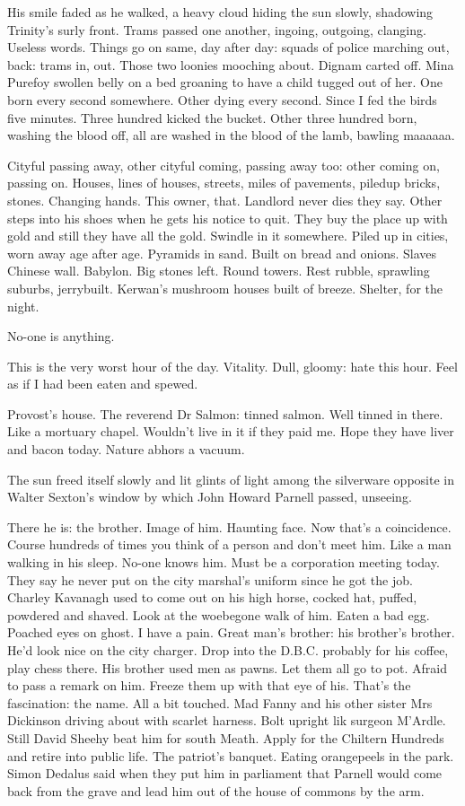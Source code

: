 His smile faded as he walked, a heavy cloud hiding the sun slowly,
shadowing Trinity's surly front. Trams passed one another, ingoing,
outgoing, clanging. Useless words. Things go on same, day after day:
squads of police marching out, back: trams in, out. Those two loonies
mooching about. Dignam carted off. Mina Purefoy swollen belly on a bed
groaning to have a child tugged out of her. One born every second
somewhere. Other dying every second. Since I fed the birds five minutes.
Three hundred kicked the bucket. Other three hundred born, washing the
blood off, all are washed in the blood of the lamb, bawling maaaaaa.

Cityful passing away, other cityful coming, passing away too: other
coming on, passing on. Houses, lines of houses, streets, miles of
pavements, piledup bricks, stones. Changing hands. This owner, that.
Landlord never dies they say. Other steps into his shoes when he gets
his notice to quit. They buy the place up with gold and still they
have all the gold. Swindle in it somewhere. Piled up in cities, worn
away age after age. Pyramids in sand. Built on bread and onions.
Slaves Chinese wall. Babylon. Big stones left. Round towers. Rest rubble,
sprawling suburbs, jerrybuilt. Kerwan's mushroom houses built of breeze.
Shelter, for the night.

No-one is anything.

This is the very worst hour of the day. Vitality. Dull, gloomy: hate
this hour. Feel as if I had been eaten and spewed.

Provost's house. The reverend Dr Salmon: tinned salmon. Well
tinned in there. Like a mortuary chapel. Wouldn't live in it if they paid
me. Hope they have liver and bacon today. Nature abhors a vacuum.

The sun freed itself slowly and lit glints of light among the silverware
opposite in Walter Sexton's window by which John Howard Parnell passed,
unseeing.

There he is: the brother. Image of him. Haunting face. Now that's a
coincidence. Course hundreds of times you think of a person and don't
meet him. Like a man walking in his sleep. No-one knows him. Must be a
corporation meeting today. They say he never put on the city marshal's
uniform since he got the job. Charley Kavanagh used to come out on his
high horse, cocked hat, puffed, powdered and shaved. Look at the
woebegone walk of him. Eaten a bad egg. Poached eyes on ghost. I have a
pain. Great man's brother: his brother's brother. He'd look nice on the
city charger. Drop into the D.B.C. probably for his coffee, play chess
there. His brother used men as pawns. Let them all go to pot. Afraid to
pass a remark on him. Freeze them up with that eye of his. That's the
fascination: the name. All a bit touched. Mad Fanny and his other sister
Mrs Dickinson driving about with scarlet harness. Bolt upright lik
 surgeon M'Ardle. Still David Sheehy beat him for south Meath.
Apply for the Chiltern Hundreds and retire into public life. The patriot's
banquet. Eating orangepeels in the park. Simon Dedalus said when they put
him in parliament that Parnell would come back from the grave and lead
him out of the house of commons by the arm.

